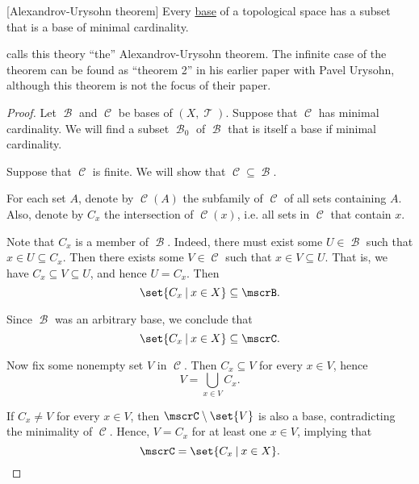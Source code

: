 \begin{theorem}\label{thm:base_has_subset_of_minimal_weight}[Alexandrov-Urysohn theorem]
  Every \hyperref[def:topological_base]{base} of a topological space has a subset that is a base of minimal cardinality.
\end{theorem}
\begin{comments}
  \item {} calls this theory \enquote{the} Alexandrov-Urysohn theorem. The infinite case of the theorem can be found as \enquote{theorem 2} in his earlier paper \cite{АлександровУрысон1950} with Pavel Urysohn, although this theorem is not the focus of their paper.
\end{comments}
\begin{proof}
  Let \( \mscrB \) and \( \mscrC \) be bases of \( (X, \mscrT) \). Suppose that \( \mscrC \) has minimal cardinality. We will find a subset \( \mscrB_0 \) of \( \mscrB \) that is itself a base if minimal cardinality.

   Suppose that \( \mscrC \) is finite. We will show that \( \mscrC \subseteq \mscrB \).

  For each set \( A \), denote by \( \mscrC(A) \) the subfamily of \( \mscrC \) of all sets containing \( A \). Also, denote by \( C_x \) the intersection of \( \mscrC(x) \), i.e. all sets in \( \mscrC \) that contain \( x \).

  Note that \( C_x \) is a member of \( \mscrB \). Indeed, there must exist some \( U \in \mscrB \) such that \( x \in U \subseteq C_x \). Then there exists some \( V \in \mscrC \) such that \( x \in V \subseteq U \). That is, we have \( C_x \subseteq V \subseteq U \), and hence \( U = C_x \). Then
  \begin{equation*}
    \set{ C_x \given x \in X } \subseteq \mscrB.
  \end{equation*}

  Since \( \mscrB \) was an arbitrary base, we conclude that
  \begin{equation*}
    \set{ C_x \given x \in X } \subseteq \mscrC.
  \end{equation*}

  Now fix some nonempty set \( V \) in \( \mscrC \). Then \( C_x \subseteq V \) for every \( x \in V \), hence
  \begin{equation*}
    V = \bigcup_{x \in V} C_x.
  \end{equation*}

  If \( C_x \neq V \) for every \( x \in V \), then \( \mscrC \setminus \set{ V } \) is also a base, contradicting the minimality of \( \mscrC \). Hence, \( V = C_x \) for at least one \( x \in V \), implying that
  \begin{equation*}
    \mscrC = \set{ C_x \given x \in X }.
  \end{equation*}


\end{proof}

